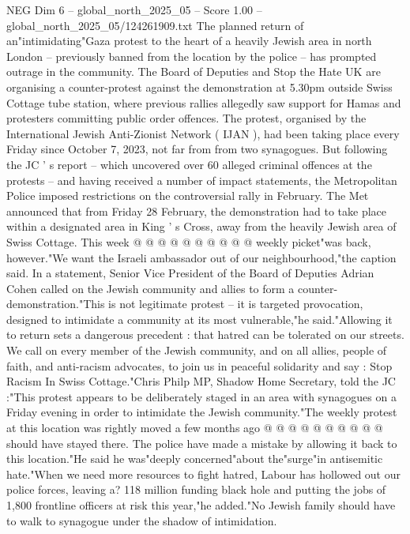 \begin{textsample}{NEG Dim 6 – global\_north\_2025\_05 – Score 1.00 – global\_north\_2025\_05/124261909.txt}  \label{ex:f6_neg_383}
The planned return of an"intimidating"Gaza protest to the heart of a heavily Jewish area in north London -- previously banned from the location by the police -- has prompted outrage in the community.
The Board of Deputies and Stop the Hate UK are organising a counter-protest against the demonstration at 5.30pm outside Swiss Cottage tube station, where previous rallies allegedly saw support for Hamas and protesters committing public order offences.
The protest, organised by the International Jewish Anti-Zionist Network ( IJAN ), had been taking place every Friday since October 7, 2023, not far from from two synagogues.
But following the JC ' s report -- which uncovered over 60 alleged criminal offences at the protests -- and having received a number of impact statements, the Metropolitan Police imposed restrictions on the controversial rally in February.
The Met announced that from Friday 28 February, the demonstration had to take place within a designated area in King ' s Cross, away from the heavily Jewish area of Swiss Cottage.
This week @ @ @ @ @ @ @ @ @ @ weekly picket"was back, however."We want the Israeli ambassador out of our neighbourhood,"the caption said.
In a statement, Senior Vice President of the Board of Deputies Adrian Cohen called on the Jewish community and allies to form a counter-demonstration."This is not legitimate protest -- it is targeted provocation, designed to intimidate a community at its most vulnerable,"he said."Allowing it to return sets a dangerous precedent : that hatred can be tolerated on our streets.
We call on every member of the Jewish community, and on all allies, people of faith, and anti-racism advocates, to join us in peaceful solidarity and say : Stop Racism In Swiss Cottage."Chris Philp MP, Shadow Home Secretary, told the JC :"This protest appears to be deliberately staged in an area with synagogues on a Friday evening in order to intimidate the Jewish community."The weekly protest at this location was rightly moved a few months ago @ @ @ @ @ @ @ @ @ @ should have stayed there.
The police have made a mistake by allowing it back to this location."He said he was"deeply concerned"about the"surge"in antisemitic hate."When we need more resources to fight hatred, Labour has hollowed out our police forces, leaving a? 118 million funding black hole and putting the jobs of 1,800 frontline officers at risk this year,"he added."No Jewish family should have to walk to synagogue under the shadow of intimidation.

\end{textsample}
